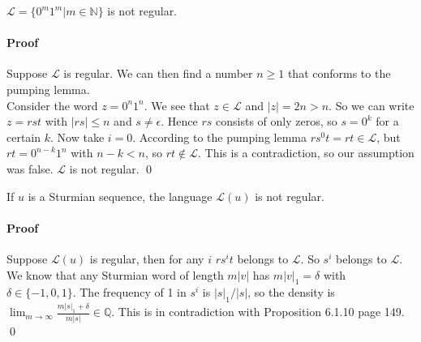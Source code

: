 \documentclass{article}
\begin{document}
\begin{automata}
$\mathcal{L} = \{0^m1^m | m \in \mathbb{N}\}$ is not regular.
\end{automata}

\paragraph{Proof}
Suppose $\mathcal{L}$ is regular. We can then find a number $n \ge 1$ that
conforms to the pumping lemma.\\
Consider the word $z = 0^n 1^n$. We see that $z \in \mathcal{L}$ and
$|z| = 2n > n$. So we can write $z = r s t$ with $|r s| \le n$ and
$s \ne \epsilon$. Hence $rs$ consists of only zeros, so $s = 0^k$ for a certain
$k$. Now take $i = 0$. According to the pumping lemma
$r s^0 t = r t \in \mathcal{L}$, but $r t = 0^{n - k} 1^n$ with $n - k < n$, so
$rt \notin \mathcal{L}$. This is a contradiction, so our assumption was false.
$\mathcal{L}$ is not regular. \qed

\begin{automata}
If $u$ is a Sturmian sequence, the language $\mathcal{L}(u)$ is not regular.
\end{automata}

\paragraph{Proof}
Suppose $\mathcal{L}(u)$ is regular, then for any $i$ $r s^i t$ belongs to
$\mathcal{L}$. So $s^i$ belongs to $\mathcal{L}$. We know that any Sturmian
word of length $m|v|$ has $m|v|_1 = \delta$ with $\delta \in \{-1, 0 , 1\}$.
The frequency of 1 in $s^i$ is $|s|_1 / |s|$, so the density is
$\lim_{m \to \infty} \frac{m|s|_1 + \delta}{m|s|} \in \mathbb{Q}$. This is in
contradiction with Proposition 6.1.10 \cite{Fogg} page 149. \qed
\end{document}
